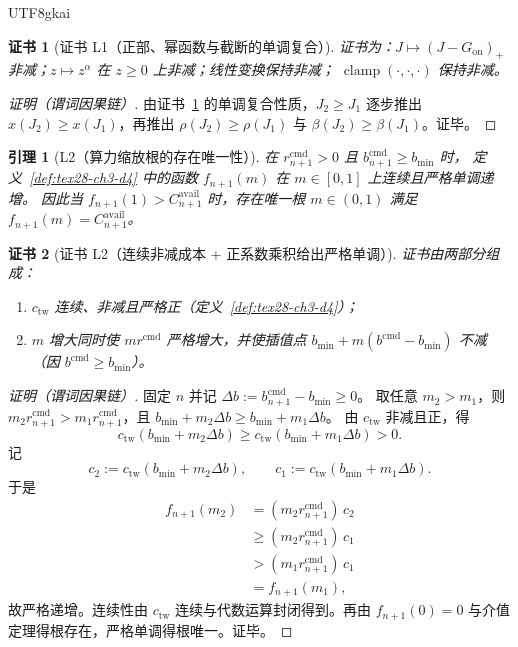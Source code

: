 \documentclass[12pt]{article}
\newtheorem{lemma}{引理}[section]
\newtheorem{Certificate}{证书}[section]
\newcommand{\clamp}{\operatorname{clamp}}
\begin{document}
\begin{CJK*}{UTF8}{gkai}
\begin{Certificate}[证书 L1（正部、幂函数与截断的单调复合）]
\label{cert:tex28-ch3-l1}
证书为：$J\mapsto(J-G_{\mathrm{on}})_{+}$ 非减；$z\mapsto z^{\alpha}$ 在 $z\ge 0$ 上非减；线性变换保持非减；
$\clamp(\cdot,\cdot,\cdot)$ 保持非减。
\end{Certificate}

\begin{proof}[证明（谓词因果链）]
由证书~\ref{cert:tex28-ch3-l1} 的单调复合性质，$J_2\ge J_1$ 逐步推出 $x(J_2)\ge x(J_1)$，再推出 $\rho(J_2)\ge\rho(J_1)$ 与 $\beta(J_2)
  \ge\beta(J_1)$。证毕。
\end{proof}

\begin{lemma}[L2（算力缩放根的存在唯一性）]
\label{lem:tex28-ch3-l2}
在 $r^{\mathrm{cmd}}_{n+1}>0$ 且 $b^{\mathrm{cmd}}_{n+1}\ge b_{\min}$ 时，
定义~\ref{def:tex28-ch3-d4} 中的函数 $f_{n+1}(m)$ 在 $m\in[0,1]$ 上连续且严格单调递增。
因此当 $f_{n+1}(1)>C^{\mathrm{avail}}_{n+1}$ 时，存在唯一根 $m\in(0,1)$ 满足 $f_{n+1}(m)=C^{\mathrm{avail}}_{n+1}$。
\end{lemma}

\begin{Certificate}[证书 L2（连续非减成本 + 正系数乘积给出严格单调）]
\label{cert:tex28-ch3-l2}
证书由两部分组成：
\begin{enumerate}
  \item $c_{\mathrm{tw}}$ 连续、非减且严格正（定义~\ref{def:tex28-ch3-d4}）；
  \item $m$ 增大同时使 $m r^{\mathrm{cmd}}$ 严格增大，并使插值点 $b_{\min}+m(b^{\mathrm{cmd}}-b_{\min})$ 不减（因 $b^{\mathrm{cmd}}\ge
    b_{\min}$）。
\end{enumerate}
\end{Certificate}

\begin{proof}[证明（谓词因果链）]
固定 $n$ 并记 $\Delta b:=b^{\mathrm{cmd}}_{n+1}-b_{\min}\ge 0$。
取任意 $m_2>m_1$，则 $m_2 r^{\mathrm{cmd}}_{n+1}>m_1 r^{\mathrm{cmd}}_{n+1}$，且
$b_{\min}+m_2\Delta b\ge b_{\min}+m_1\Delta b$。
由 $c_{\mathrm{tw}}$ 非减且正，得
\[
  c_{\mathrm{tw}}(b_{\min}+m_2\Delta b)\ge c_{\mathrm{tw}}(b_{\min}+m_1\Delta b)>0.
\]
记
\[
  c_2:=c_{\mathrm{tw}}(b_{\min}+m_2\Delta b),
  \qquad
  c_1:=c_{\mathrm{tw}}(b_{\min}+m_1\Delta b).
\]
于是
\[
  \begin{aligned}
    f_{n+1}(m_2)
    &= (m_2 r^{\mathrm{cmd}}_{n+1})\,c_2 \\
    &\ge (m_2 r^{\mathrm{cmd}}_{n+1})\,c_1 \\
    &> (m_1 r^{\mathrm{cmd}}_{n+1})\,c_1 \\
    &= f_{n+1}(m_1),
  \end{aligned}
\]
故严格递增。连续性由 $c_{\mathrm{tw}}$ 连续与代数运算封闭得到。再由 $f_{n+1}(0)=0$ 与介值定理得根存在，严格单调得根唯一。证毕。
\end{proof}


\end{CJK*}
\end{document}
